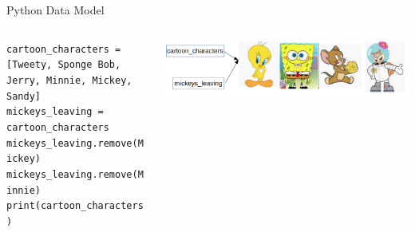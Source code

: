     \begin{frame}{Python Data Model}
       \begin{columns}
            \begin{column}[c]{0.5\textwidth}
                \texttt{cartoon\_characters = [\textquotesingle Tweety\textquotesingle , \textquotesingle Sponge Bob\textquotesingle , \textquotesingle Jerry\textquotesingle , \textquotesingle Minnie\textquotesingle , \textquotesingle Mickey\textquotesingle , \textquotesingle Sandy\textquotesingle ]}                \\
                \pause \texttt{mickeys\_leaving = cartoon\_characters}\\
                \pause \texttt{mickeys\_leaving.remove(\textquotesingle Mickey\textquotesingle )}\\
                \pause \texttt{mickeys\_leaving.remove(\textquotesingle Minnie\textquotesingle )}\\
                \pause \texttt{print(cartoon\_characters)}
            \end{column}
            \begin{column}[c]{0.5\textwidth}
                \includegraphics[width=\textwidth]{images/list_cartoons/pointer.png}
                           

\end{column}
\end{columns}
\end{frame}
